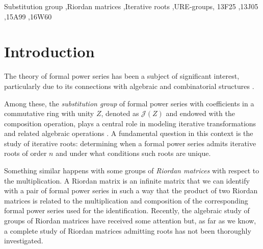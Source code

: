 \documentclass[preprint,12pt]{elsarticle}
\begin{document}
\begin{frontmatter}


\begin{keyword}
Substitution group \sep Riordan matrices \sep Iterative roots \sep  URE-groups,
\MSC 13F25 \sep 13J05 \sep 15A99 \sep 16W60
\end{keyword}

\end{frontmatter}


\section{Introduction} \label{intro-sec}
The theory of formal power series  has been a subject of significant interest, particularly due to its connections with algebraic and combinatorial structures \cite{Niven}. 

Among these, the \emph{substitution group} of formal power series with coefficients in a commutative ring with unity $Z$, denoted as $\mathcal J(Z)$ and endowed with the composition operation, plays a central role in modeling iterative transformations and related algebraic operations \cite{B,Jen}. A fundamental question in this context is the study of iterative roots: determining when a formal power series admits iterative roots of order $n$ and under what conditions such roots are unique. 

Something similar happens with some groups of \emph{Riordan matrices} with respect to the multiplication. A Riordan matrix is an infinite matrix that we can identify with a pair of formal power series in such a way that the product of two Riordan matrices is related to the multiplication and composition of the corresponding formal power series used for the identification. Recently, the algebraic study of groups of Riordan matrices have received some attention \cite{CK, CJKS, CPT, LMP, LMP2, LMP3} but, as far as we know, a complete study of Riordan matrices admitting roots has not been thoroughly investigated.
\end{document}

